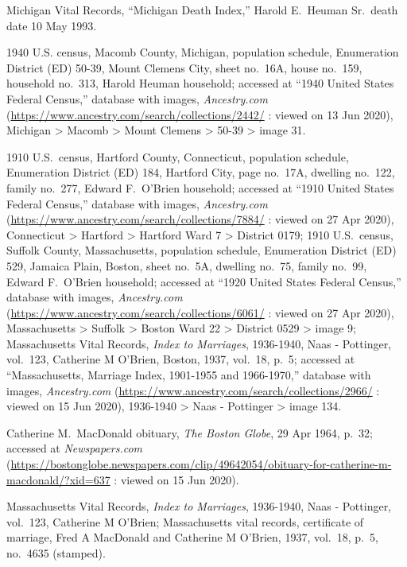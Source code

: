 \begin{thebibliography}{999}
Michigan Vital Records, ``Michigan Death Index,'' Harold E.\ Heuman Sr.\, death date 10 May 1993.

1940 U.S. census, Macomb County, Michigan, population schedule, Enumeration District (ED) 50-39, Mount Clemens City, sheet no.\ 16A, house no.\ 159, household no.\ 313, Harold Heuman household; accessed at ``1940 United States Federal Census,'' database with images, \textit{Ancestry.com} (\url{https://www.ancestry.com/search/collections/2442/} : viewed on 13 Jun 2020), Michigan > Macomb > Mount Clemens > 50-39 > image 31.


1910 U.S.\ census, Hartford County, Connecticut, population schedule, Enumeration District (ED) 184, Hartford City, page no.\ 17A, dwelling no.\ 122, family no.\ 277, Edward F.\ O'Brien household; accessed at ``1910 United States Federal Census,'' database with images, \textit{Ancestry.com} (\url{https://www.ancestry.com/search/collections/7884/} : viewed on 27 Apr 2020), Connecticut > Hartford > Hartford Ward 7 > District 0179; 1910 U.S.\ census, Suffolk County, Massachusetts, population schedule, Enumeration District (ED) 529, Jamaica Plain, Boston, sheet no.\ 5A, dwelling no.\ 75, family no.\ 99, Edward F.\ O'Brien household; accessed at ``1920 United States Federal Census,'' database with images, \textit{Ancestry.com} (\url{https://www.ancestry.com/search/collections/6061/} : viewed on 27 Apr 2020), Massachusetts > Suffolk > Boston Ward 22 > District 0529 > image 9; Massachusetts Vital Records, \textit{Index to Marriages}, 1936-1940, Naas - Pottinger, vol.\ 123, Catherine M O'Brien, Boston, 1937, vol.\ 18, p.\ 5; accessed at ``Massachusetts, Marriage Index, 1901-1955 and 1966-1970,'' database with images, \textit{Ancestry.com} (\url{https://www.ancestry.com/search/collections/2966/} : viewed on 15 Jun 2020), 1936-1940 > Naas - Pottinger > image 134.

Catherine M.\ MacDonald obituary, \textit{The Boston Globe}, 29 Apr 1964, p.\ 32; accessed at \textit{Newspapers.com} (\url{https://bostonglobe.newspapers.com/clip/49642054/obituary-for-catherine-m-macdonald/?xid=637} : viewed on 15 Jun 2020).

Massachusetts Vital Records, \textit{Index to Marriages}, 1936-1940, Naas - Pottinger, vol.\ 123, Catherine M O'Brien; Massachusetts vital records, certificate of marriage, Fred A MacDonald and Catherine M O'Brien, 1937, vol.\ 18, p.\ 5, no.\ 4635 (stamped).


\end{thebibliography}

